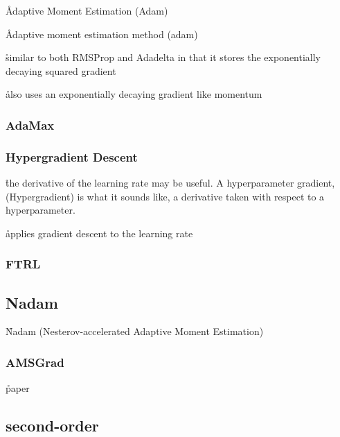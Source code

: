 \r{Adaptive Moment Estimation (Adam)~\cite{kingma2014adam}}

\r{Adaptive moment estimation method (adam)}

\r{similar to both RMSProp and Adadelta in that it stores the exponentially decaying squared gradient}

\r{also uses an exponentially decaying gradient like momentum}


\subsubsection{AdaMax}


\subsubsection{Hypergradient Descent}


\r{the derivative of the learning rate may be useful. A hyperparameter gradient, (Hypergradient) is what it sounds like, a derivative taken with respect to a hyperparameter.}

\r{applies gradient descent to the learning rate}



\subsubsection{FTRL}



\subsection{Nadam}

\r{Nadam (Nesterov-accelerated Adaptive Moment Estimation)~\cite{dozat2016incorporating}}


\subsubsection{AMSGrad}

\r{paper\cite{reddi2019convergence}}


\subsection{second-order}

